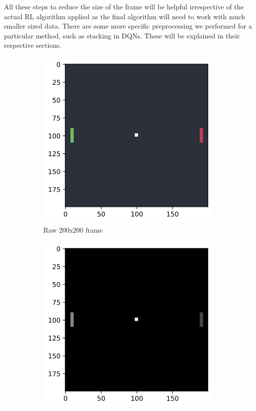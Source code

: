 \medskip
\noindent
All these steps to reduce the size of the frame will be helpful irrespective of the actual RL algorithm applied as the final algorithm will need to work with much smaller sized data. There are some more specific preprocessing we performed for a particular method, such as stacking in DQNs. These will be explained in their respective sections.
\begin{figure}[htb!]
    \centering
    \begin{subfigure}{.49\textwidth}
        \centering
        \includegraphics[width=\textwidth]{figures/raw.png}
        \caption{Raw 200x200 frame}
        \label{fig-raw}
    \end{subfigure}
    \begin{subfigure}{0.49\textwidth}
        \centering
        \includegraphics[width=\textwidth]{figures/bw.png}

\end{subfigure}
\end{figure}
